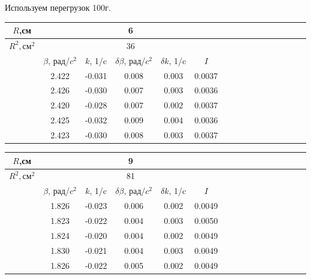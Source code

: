\documentclass[14pt]{article}
\begin{document}
\vspace{1cm}
Используем перегрузок 100г.


\begin{center}
\begin{tabular}{|c|c|c|c|c|c|c|c|c|c|c|c|c|c|c|c|}
\hline
$R$,см	&	\multicolumn{5}{|c|}{6}			\\
\hline
$R^2, \text{см}^2$	&	\multicolumn{5}{|c|}{36}			\\
\hline
		&	$\beta$, рад/$c^2$	&	$k$, 1/c	&	$\delta\beta$, рад/$c^2$	&	$\delta k$, 1/c		&	$I$		\\
\hline
		&	2.422				&	-0.031		&	0.008						&	0.003				&	0.0037	\\
\hline
		&	2.426				&	-0.030		&	0.007						&	0.003				&	0.0036	\\
\hline
		&	2.420				&	-0.028		&	0.007						&	0.002				&	0.0037	\\
\hline
		&	2.425				&	-0.032		&	0.009						&	0.004				&	0.0036	\\
\hline
		&	2.423				&	-0.030		&	0.008						&	0.003				&	0.0037	\\
\hline
\end{tabular}
\end{center}

\begin{center}
\begin{tabular}{|c|c|c|c|c|c|c|c|c|c|c|c|c|c|c|c|}
\hline
$R$,см	&	\multicolumn{5}{|c|}{9}			\\
\hline
$R^2, \text{см}^2$	&	\multicolumn{5}{|c|}{81}			\\
\hline
		&	$\beta$, рад/$c^2$	&	$k$, 1/c	&	$\delta\beta$, рад/$c^2$	&	$\delta k$, 1/c		&	$I$		\\
\hline
		&	1.826				&	-0.023		&	0.006						&	0.002				&	0.0049	\\
\hline
		&	1.823				&	-0.022		&	0.004						&	0.003				&	0.0050	\\
\hline
		&	1.824				&	-0.020		&	0.004						&	0.002				&	0.0049	\\
\hline
		&	1.830				&	-0.021		&	0.004						&	0.003				&	0.0049	\\
\hline
		&	1.826				&	-0.022		&	0.005						&	0.002				&	0.0049	\\
\hline
\end{tabular}
\end{center}
\end{document}
